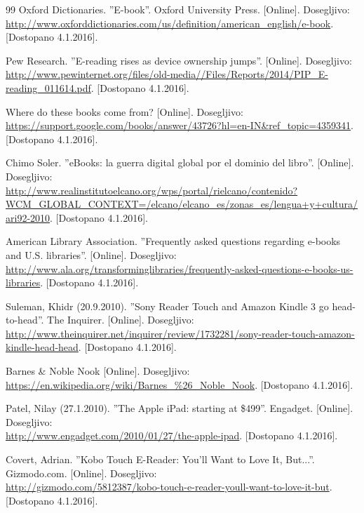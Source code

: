 \documentclass[a4paper, 12pt]{book}
\begin{document}
\begin{thebibliography}{99}
 Oxford Dictionaries. ''E-book''.  Oxford University Press. 
[Online]. Dosegljivo:\\ 
\url{http://www.oxforddictionaries.com/us/definition/american\_english/e-book}.
[Dostopano 4.1.2016].

 Pew Research. ''E-reading rises as device ownership jumps''. 
[Online]. Dosegljivo:\\ \url{http://www.pewinternet.org/files/old-media//Files/Reports/2014/PIP\_E-reading\_011614.pdf}.
[Dostopano 4.1.2016]. 

 Where do these books come from?
[Online]. Dosegljivo:\\ 
\url{https://support.google.com/books/answer/43726?hl=en-IN\&ref\_topic=4359341}.
[Dostopano 4.1.2016].

 Chimo Soler. ''eBooks: la guerra digital global por el dominio del libro''.
[Online]. Dosegljivo:\\ 
\url{http://www.realinstitutoelcano.org/wps/portal/rielcano/contenido?WCM\_GLOBAL\_CONTEXT=/elcano/elcano\_es/zonas\_es/lengua+y+cultura/ari92-2010}.
[Dostopano 4.1.2016].

 American Library Association. ''Frequently asked questions regarding e-books and U.S. libraries''.
[Online]. Dosegljivo:\\ \url{http://www.ala.org/transforminglibraries/frequently-asked-questions-e-books-us-libraries}.
[Dostopano 4.1.2016].

 Suleman, Khidr (20.9.2010). ''Sony Reader Touch and Amazon Kindle 3 go head-to-head''. The Inquirer.
[Online]. Dosegljivo:\\ \url{http://www.theinquirer.net/inquirer/review/1732281/sony-reader-touch-amazon-kindle-head-head}.
[Dostopano 4.1.2016].


 Barnes \& Noble Nook
[Online]. Dosegljivo:\\ 
\url{https://en.wikipedia.org/wiki/Barnes\_\%26\_Noble\_Nook}.
[Dostopano 4.1.2016].

 Patel, Nilay (27.1.2010). ''The Apple iPad: starting at \$499''. Engadget.
[Online]. Dosegljivo:\\ 
\url{http://www.engadget.com/2010/01/27/the-apple-ipad}.
[Dostopano 4.1.2016].

 Covert, Adrian. ''Kobo Touch E-Reader: You'll Want to Love It, But...''. Gizmodo.com. 
[Online]. Dosegljivo:\\ 
\url{http://gizmodo.com/5812387/kobo-touch-e-reader-youll-want-to-love-it-but}.
[Dostopano 4.1.2016].


\end{thebibliography}
\end{document}
